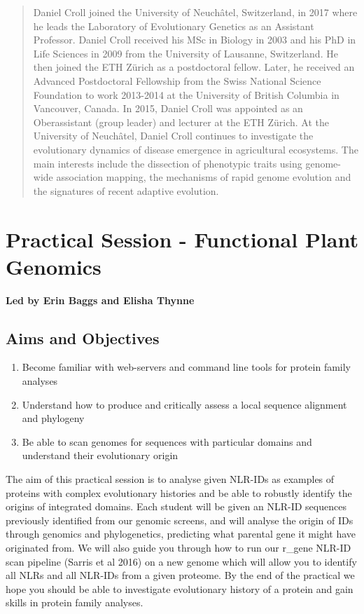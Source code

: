 \documentclass[12pt,]{book}
\providecommand{\tightlist}{%
  \setlength{\itemsep}{0pt}\setlength{\parskip}{0pt}}
\theoremstyle{definition}
\theoremstyle{definition}
\theoremstyle{remark}
\begin{document}
\begin{quote}
Daniel Croll joined the University of Neuchâtel, Switzerland, in 2017
where he leads the Laboratory of Evolutionary Genetics as an Assistant
Professor. Daniel Croll received his MSc in Biology in 2003 and his PhD
in Life Sciences in 2009 from the University of Lausanne, Switzerland.
He then joined the ETH Zürich as a postdoctoral fellow. Later, he
received an Advanced Postdoctoral Fellowship from the Swiss National
Science Foundation to work 2013-2014 at the University of British
Columbia in Vancouver, Canada. In 2015, Daniel Croll was appointed as an
Oberassistant (group leader) and lecturer at the ETH Zürich. At the
University of Neuchâtel, Daniel Croll continues to investigate the
evolutionary dynamics of disease emergence in agricultural ecosystems.
The main interests include the dissection of phenotypic traits using
genome-wide association mapping, the mechanisms of rapid genome
evolution and the signatures of recent adaptive evolution.
\end{quote}

\newpage

\section*{Practical Session - Functional Plant
Genomics}\label{practical-session---functional-plant-genomics}

\textbf{Led by Erin Baggs and Elisha Thynne}

\subsection*{Aims and Objectives}\label{aims-and-objectives-5}

\begin{enumerate}
\def\labelenumi{\arabic{enumi}.}
\tightlist
\item
  Become familiar with web-servers and command line tools for protein
  family analyses
\item
  Understand how to produce and critically assess a local sequence
  alignment and phylogeny
\item
  Be able to scan genomes for sequences with particular domains and
  understand their evolutionary origin
\end{enumerate}

The aim of this practical session is to analyse given NLR-IDs as
examples of proteins with complex evolutionary histories and be able to
robustly identify the origins of integrated domains. Each student will
be given an NLR-ID sequences previously identified from our genomic
screens, and will analyse the origin of IDs through genomics and
phylogenetics, predicting what parental gene it might have originated
from. We will also guide you through how to run our r\_gene NLR-ID scan
pipeline (Sarris et al 2016) on a new genome which will allow you to
identify all NLRs and all NLR-IDs from a given proteome. By the end of
the practical we hope you should be able to investigate evolutionary
history of a protein and gain skills in protein family analyses.
\end{document}

